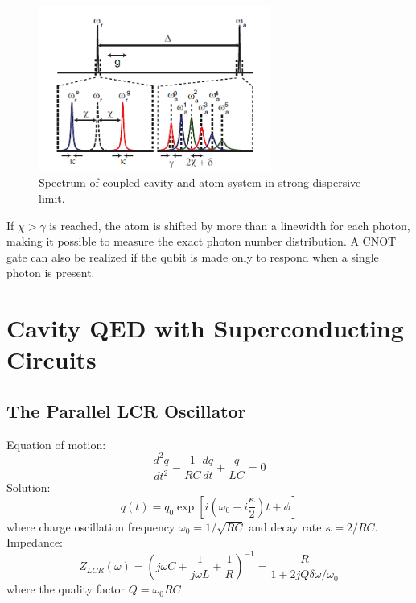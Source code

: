 \documentclass[8pt,a4paper,twocolumn]{article} %
\numberwithin{equation}{section} %
\begin{document}
			\begin{figure}[!h]
				\centering
				\includegraphics[width=3in]{spectrumInSDlimit.png}
				\caption{Spectrum of coupled cavity and atom system in strong dispersive limit. \cite{Schuster2007}}
				\label{pic:spectrumInSDlimit}
			\end{figure}

			If $\chi>\gamma$ is reached, the atom is shifted by more than a linewidth for each photon, making it possible to measure the exact photon number distribution. A CNOT gate can also be realized if the qubit is made only to respond when a single photon is present.








	\section{Cavity QED with Superconducting Circuits} %
	\label{sec:cavity_qed_with_superconducting_circuits}
		\subsection{The Parallel LCR Oscillator} %
		\label{sub:the_lcr_oscillator}
			Equation of motion:
			\begin{equation}
				\frac{d^2 q}{dt^2}-\frac{1}{RC}\frac{dq}{dt}+\frac{q}{LC}=0
			\end{equation}
			Solution:
			\begin{equation}
				q(t)=q_0\exp\left[ i(\omega_0 +i \frac{\kappa}{2})t+\phi \right]
			\end{equation}
			where charge oscillation frequency $\omega_0=1/\sqrt{RC} $ and decay rate $ \kappa=2/RC $.\\
			Impedance:
			\begin{equation}
			\label{eqt:LCR_Impedance}
				Z_{LCR}(\omega)=\left( j \omega C+\frac{1}{j \omega L}+\frac{1}{R} \right)^{-1}=\frac{R}{1+2jQ \delta \omega/\omega_0}
			\end{equation}
			where the quality factor $Q=\omega_0 RC $
\end{document}
